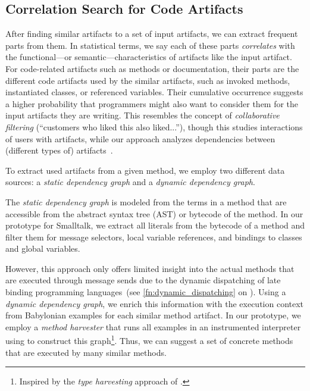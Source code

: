 \subsection*{Correlation Search for Code Artifacts}
\label{sec:suggestions/search/correlations}

After finding similar artifacts to a set of input artifacts, we can extract frequent parts from them.
In statistical terms, we say each of these parts \emph{correlates} with the functional---or semantic---characteristics of artifacts like the input artifact.
For code-related artifacts such as methods or documentation, their parts are the different code artifacts used by the similar artifacts, such as invoked methods, instantiated classes, or referenced variables.
Their cumulative occurrence suggests a higher probability that programmers might also want to consider them for the input artifacts they are writing.
This resembles the concept of \emph{collaborative filtering} (``customers who liked this also liked...''), though this studies interactions of users with artifacts, while our approach analyzes dependencies between (different types of) artifacts~\cite{su2009survey}.

To extract used artifacts from a given method, we employ two different data sources: a \emph{static dependency graph} and a \emph{dynamic dependency graph}.

The \emph{static dependency graph} is modeled from the terms in a method that are accessible from the abstract syntax tree (AST) or bytecode of the method.
In our prototype for Smalltalk, we extract all literals from the bytecode of a method and filter them for message selectors, local variable references, and bindings to classes and global variables.

However, this approach only offers limited insight into the actual methods that are executed through message sends due to the dynamic dispatching of late binding programming languages~(see \cref{fn:dynamic_dispatching} on ).
Using a \emph{dynamic dependency graph}, we enrich this information with the execution context from Babylonian examples for each similar method artifact.
In our prototype, we employ a \emph{method harvester} that runs all examples in an instrumented interpreter using  to construct this graph\footnote{Inspired by the \emph{type harvesting} approach of \cite{haupt2011type}.}.
Thus, we can suggest a set of concrete methods that are executed by many similar methods.

